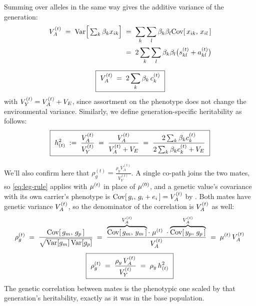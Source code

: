 \documentclass[12pt]{article}
\begin{document}
Summing over alleles in the same way gives the additive variance of the generation:
\begin{equation}\label{eq:VA-from-as}
\begin{gathered}
\begin{aligned}
    V_A^{(t)} \;=\; \mathrm{Var}\Big[\textstyle\sum_k \beta_k x_{ik}\Big]
    \;&=\; \sum_{k}\sum_{l} \beta_k\beta_l \mathrm{Cov}[\,x_{ik},\, x_{il}\,] \\[2pt]
    \;&=\; 2\sum_{k}\sum_{l} \beta_k\beta_l\big(s^{(t)}_{kl} + a^{(t)}_{kl}\big)
\end{aligned} \\[6pt]
    \boxed{\ V_A^{(t)} \;=\; 2\sum_{k} \beta_k\, c^{(t)}_k \ }
\end{gathered}
\end{equation}
with $V_Y^{(t)} = V_A^{(t)} + V_E$, since assortment on the phenotype does not change the environmental variance.
Similarly, we define generation-specific heritability as follows:
\begin{equation}\label{eq:hsq-t}
    \boxed{\ h^2_{(t)} \;:=\; \frac{V_A^{(t)}}{V_Y^{(t)}} \;=\; \frac{V_A^{(t)}}{V_A^{(t)} + V_E}
    \;=\; \frac{2\sum_k \beta_k c^{(t)}_k}{2\sum_k \beta_k c^{(t)}_k + V_E} \ }
\end{equation}

We'll also confirm here that $\rho_g^{(t)} = \frac{ \rho_y V_A^{(t)} }{V_Y^{(t)} }$.
A single co-path joins the two mates, so \eqref{eq:leg-rule} applies with $\mu^{(t)}$ in place of $\mu^{(0)}$, and a genetic value's covariance with its own carrier's phenotype is $\mathrm{Cov}[\,g_i,\, g_i + e_i\,] = V_A^{(t)}$ by .
Both mates have genetic variance $V_A^{(t)}$, so the denominator of the correlation is $V_A^{(t)}$ as well:
\begin{equation}\label{eq:rhog-t}
\begin{gathered}
    \rho_g^{(t)} \;=\; \frac{\mathrm{Cov}[\,g_m,\, g_p\,]}{\sqrt{\mathrm{Var}[g_m]\,\mathrm{Var}[g_p]}}
    \;=\; \frac{\overbrace{\mathrm{Cov}[\,g_m,\, y_m\,]}^{V_A^{(t)}} \cdot\; \mu^{(t)} \;\cdot \overbrace{\mathrm{Cov}[\,y_p,\, g_p\,]}^{V_A^{(t)}}}{V_A^{(t)}}
    \;=\; \mu^{(t)}\,V_A^{(t)} \\[4pt]
    \boxed{\ \rho_g^{(t)} \;=\; \frac{\rho_y\,V_A^{(t)}}{V_Y^{(t)}} \;=\; \rho_y\,h^2_{(t)} \ }
\end{gathered}
\end{equation}
The genetic correlation between mates is the phenotypic one scaled by that generation's heritability, exactly as it was in the base population.
\end{document}
